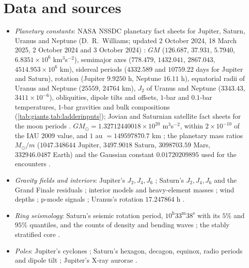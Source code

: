 \documentclass[11pt]{article}
\theoremstyle{definition}\newtheorem{definition}[theorem]{Definition}
\theoremstyle{remark}\newtheorem{remark}[theorem]{Remark}
\begin{document}
\section{Data and sources}\label{sec:data}
\begin{itemize}
\item \emph{Planetary constants}: NASA NSSDC planetary fact sheets for Jupiter, Saturn, Uranus and Neptune (D.~R.~Williams; updated 2 October 2024, 18 March 2025, 2 October 2024 and 3 October 2024) \cite{NSSDCJ,NSSDCS,NSSDCU,NSSDCN}: $GM$ ($126.687$, $37.931$, $5.7940$, $6.8351\times10^{6}$ km$^3$s$^{-2}$), semimajor axes ($778.479$, $1432.041$, $2867.043$, $4514.953\times10^6$ km), sidereal periods ($4332.589$ and $10759.22$ days for Jupiter and Saturn), rotation (Jupiter $9.9250$ h, Neptune $16.11$ h), equatorial radii of Uranus and Neptune ($25559$, $24764$ km), $J_2$ of Uranus and Neptune ($3343.43$, $3411\times10^{-6}$), obliquities, dipole tilts and offsets, $1$-bar and $0.1$-bar temperatures, $1$-bar gravities and bulk compositions (\cref{tab:giants,tab:ladderinputs}); Jovian and Saturnian satellite fact sheets for the moon periods \cite{NSSDCJsat,NSSDCSsat}. $GM_\odot=1.32712440018\times10^{20}$ m$^3$s$^{-2}$, within $2\times10^{-10}$ of the IAU 2009 value, and $1$ au $=149597870.7$ km \cite{IAU2009}; the planetary mass ratios $M_\odot/m$ ($1047.348644$ Jupiter, $3497.9018$ Saturn, $3098703.59$ Mars, $332946.0487$ Earth) and the Gaussian constant $0.01720209895$ used for the encounters \cite{IAU2009}.
\item \emph{Gravity fields and interiors}: Jupiter's $J_2,J_4,J_6$ \cite{Durante2020}; Saturn's $J_2,J_4,J_6$ and the Grand Finale residuals \cite{Iess}; interior models and heavy-element masses \cite{Wahl,Militzer2024,MankovichFuller}; wind depths \cite{Kaspi2018,Kaspi2020,Galanti}; p-mode signals \cite{Durante2022,Markham,Gaulme}; Uranus's rotation $17.247864$ h \cite{Lamy}.
\item \emph{Ring seismology}: Saturn's seismic rotation period, $10^\mathrm{h}33^\mathrm{m}38^\mathrm{s}$ with its $5\%$ and $95\%$ quantiles, and the counts of density and bending waves \cite{Mankovich2019}; the stably stratified core \cite{MankovichFuller}.
\item \emph{Poles}: Jupiter's cyclones \cite{Adriani,PIA,Mura,Li,Chen}; Saturn's hexagon, decagon, equinox, radio periods and dipole tilt \cite{SLHex,SLDec,SSL,AAQ,Fischer,Cao}; Jupiter's X-ray aurorae \cite{Gladstone,Dunn}.

\end{itemize}
\end{document}
